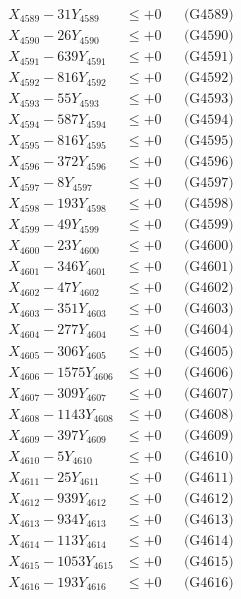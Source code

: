 \documentclass[a4paper,10pt]{article}
\begin{document}
{\begin{align}
X_{4589} - 31Y_{4589} &\leq +0 && \text{(G4589)} \\
X_{4590} - 26Y_{4590} &\leq +0 && \text{(G4590)} \\
\allowbreak
X_{4591} - 639Y_{4591} &\leq +0 && \text{(G4591)} \\
X_{4592} - 816Y_{4592} &\leq +0 && \text{(G4592)} \\
X_{4593} - 55Y_{4593} &\leq +0 && \text{(G4593)} \\
X_{4594} - 587Y_{4594} &\leq +0 && \text{(G4594)} \\
X_{4595} - 816Y_{4595} &\leq +0 && \text{(G4595)} \\
X_{4596} - 372Y_{4596} &\leq +0 && \text{(G4596)} \\
X_{4597} - 8Y_{4597} &\leq +0 && \text{(G4597)} \\
X_{4598} - 193Y_{4598} &\leq +0 && \text{(G4598)} \\
X_{4599} - 49Y_{4599} &\leq +0 && \text{(G4599)} \\
X_{4600} - 23Y_{4600} &\leq +0 && \text{(G4600)} \\
\allowbreak
X_{4601} - 346Y_{4601} &\leq +0 && \text{(G4601)} \\
X_{4602} - 47Y_{4602} &\leq +0 && \text{(G4602)} \\
X_{4603} - 351Y_{4603} &\leq +0 && \text{(G4603)} \\
X_{4604} - 277Y_{4604} &\leq +0 && \text{(G4604)} \\
X_{4605} - 306Y_{4605} &\leq +0 && \text{(G4605)} \\
X_{4606} - 1575Y_{4606} &\leq +0 && \text{(G4606)} \\
X_{4607} - 309Y_{4607} &\leq +0 && \text{(G4607)} \\
X_{4608} - 1143Y_{4608} &\leq +0 && \text{(G4608)} \\
X_{4609} - 397Y_{4609} &\leq +0 && \text{(G4609)} \\
X_{4610} - 5Y_{4610} &\leq +0 && \text{(G4610)} \\
\allowbreak
X_{4611} - 25Y_{4611} &\leq +0 && \text{(G4611)} \\
X_{4612} - 939Y_{4612} &\leq +0 && \text{(G4612)} \\
X_{4613} - 934Y_{4613} &\leq +0 && \text{(G4613)} \\
X_{4614} - 113Y_{4614} &\leq +0 && \text{(G4614)} \\
X_{4615} - 1053Y_{4615} &\leq +0 && \text{(G4615)} \\
X_{4616} - 193Y_{4616} &\leq +0 && \text{(G4616)} \\

\end{align}}
\end{document}
